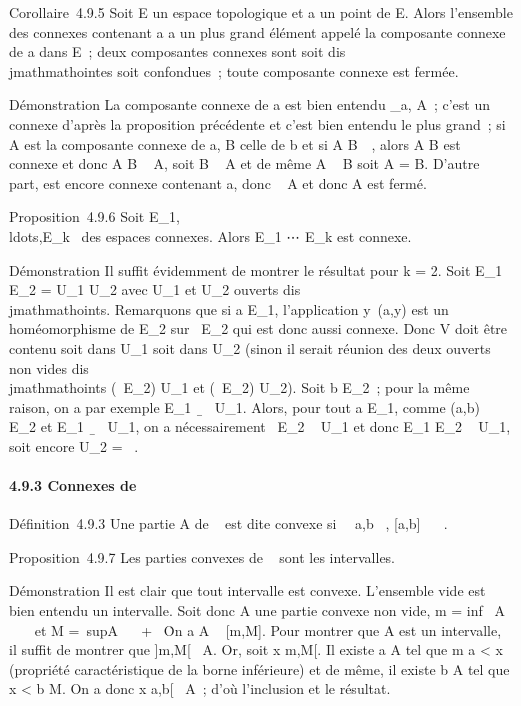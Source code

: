 \documentclass[]{article}
\begin{document}
Corollaire~4.9.5 Soit E un espace topologique et a un point de E. Alors
l'ensemble des connexes contenant a a un plus grand élément appelé la
composante connexe de a dans E~; deux composantes connexes sont soit
dis\\jmathmathointes soit confondues~; toute composante connexe est fermée.

Démonstration La composante connexe de a est bien entendu
\⋃  _a\inA,
A\textconnexeA~; c'est un connexe d'après la
proposition précédente et c'est bien entendu le plus grand~; si A est la
composante connexe de a, B celle de b et si A \bigcap
B\neq~\varnothing~, alors A \cup B est connexe et donc A \cup B \subset~
A, soit B \subset~ A et de même A \subset~ B soit A = B. D'autre part,
\overlineA est encore connexe contenant a, donc
\overlineA \subset~ A et donc A est fermé.

Proposition~4.9.6 Soit
E_1,\\ldots,E_k~
des espaces connexes. Alors E_1 \times⋯ \times
E_k est connexe.

Démonstration Il suffit évidemment de montrer le résultat pour k = 2.
Soit E_1 \times E_2 = U_1 \cup U_2 avec
U_1 et U_2 ouverts dis\\jmathmathoints. Remarquons que si a \in
E_1, l'application y\mapsto~(a,y) est un
homéomorphisme de E_2 sur \a\
\times E_2 qui est donc aussi connexe. Donc V doit être contenu soit
dans U_1 soit dans U_2 (sinon il serait réunion des
deux ouverts non vides dis\\jmathmathoints (\a\
\times E_2) \bigcap U_1 et (\a\
\times E_2) \bigcap U_2). Soit b \in E_2~; pour la même
raison, on a par exemple E_1
\times\b\ \subset~ U_1. Alors, pour tout
a \in E_1, comme (a,b) \in\a\ \times
E_2 et E_1 \times\b\ \subset~
U_1, on a nécessairement \a\
\times E_2 \subset~ U_1 et donc E_1 \times E_2 \subset~
U_1, soit encore U_2 = \varnothing~.

\paragraph{4.9.3 Connexes de ~}

Définition~4.9.3 Une partie A de ~ est dite convexe si
\forall~~a,b \in {}~, {[}a,b{]} \subset~ ~.

Proposition~4.9.7 Les parties convexes de ~ sont les intervalles.

Démonstration Il est clair que tout intervalle est convexe. L'ensemble
vide est bien entendu un intervalle. Soit donc A une partie convexe non
vide, m = inf~ A \in \mathbb{R}~
\cup\-\infty~\ et M =\
supA \in {}~ \cup\ + \infty~\. On a A \subset~
{[}m,M{]}. Pour montrer que A est un intervalle, il suffit de montrer
que {]}m,M{[}\subset~ A. Or, soit x \in{]}m,M{[}. Il existe a \in A tel que m \leq a
\textless{} x (propriété caractéristique de la borne inférieure) et de
même, il existe b \in A tel que x \textless{} b \leq M. On a donc x
\in{]}a,b{[}\subset~ A~; d'où l'inclusion et le résultat.
\end{document}
